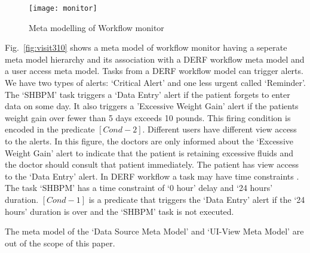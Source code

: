 \documentclass[a4paper]{llncs}
\begin{document}


\begin{figure}
  \begin{center}
    \texttt{[image: monitor]}
  \end{center} 
  \caption{Meta modelling of Workflow monitor}
  \label{fig:monitor}  
\end{figure}

Fig.~\ref{fig:visit310} shows a meta model of workflow monitor having a seperate meta model hierarchy and its association with a DERF workflow meta model and a user access meta model. 
Tasks from a DERF workflow model can trigger alerts. We have two types of alerts: `Critical Alert' and one less urgent called `Reminder'. 
The `SHBPM' task triggers a `Data Entry' alert if the patient forgets to enter data on some day. 
It also triggers a 'Excessive Weight Gain' alert if the patients weight gain over fewer than 5 days exceeds 10 pounds. This firing condition is encoded in the predicate $[Cond-2]$. 
Different users have different view access to the alerts. In this figure, the doctors are only informed about the `Excessive Weight Gain' alert to indicate that 
the patient is retaining excessive fluids and the doctor should consult that patient immediately. The patient has view access to the `Data Entry' alert. 
In DERF workflow a task may have time constraints \cite{WangRutleEtAl2012TASE}. The task `SHBPM' has a time constraint of `0 hour' delay and `24 hours' duration.
$[Cond-1]$ is a predicate that triggers the `Data Entry' alert if the `24 hours' duration is over and the `SHBPM' task is not executed. 

The meta model of the `Data Source Meta Model' and `UI-View Meta Model' are out of the scope of this paper. 
\end{document}
